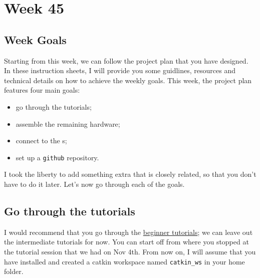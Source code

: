 \chapter*{Week 45}








\section*{Week Goals}

Starting from this week, we can follow the project plan that you have designed.
In these instruction sheets, I will provide you some guidlines, resources and technical details on how to achieve the weekly goals.
This week, the project plan features four main goals:
\begin{itemize}
\item go through the \ROS{} tutorials;
\item assemble the remaining hardware;
\item connect to the \CF{}s;
\item set up a \texttt{github} repository.
\end{itemize}
I took the liberty to add something extra that is closely related, so that you don't have to do it later.
Let's now go through each of the goals.








\section*{Go through the \ROS{} tutorials}

I would recommend that you go through the \href{http://wiki.ros.org/ROS/Tutorials#Beginner_Level}{beginner tutorials}; we can leave out the intermediate tutorials for now.
You can start off from where you stopped at the \ROS{} tutorial session that we had on Nov 4th.
From now on, I will assume that you have installed \ROS{} and created a catkin workspace named \verb|catkin_ws| in your home folder.






